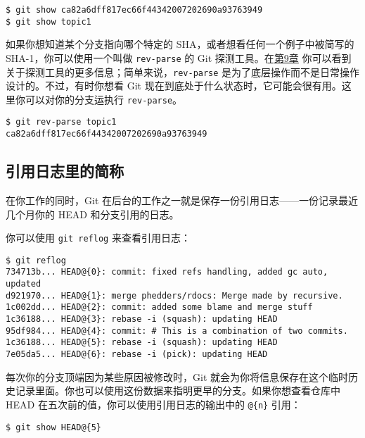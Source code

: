 \documentclass[a4paper]{book}
\newcommand{\prechap}{第}
\newcommand{\postchap}{章}
\newcommand{\chapref}[1]{\hyperref[chap:#1]{\prechap #1\postchap}}
\begin{document}
\begin{shaded}\begin{verbatim}
$ git show ca82a6dff817ec66f44342007202690a93763949
$ git show topic1
\end{verbatim}\end{shaded}

如果你想知道某个分支指向哪个特定的 SHA，或者想看任何一个例子中被简写的 SHA-1，你可以使用一个叫做 \texttt{rev-parse} 的 Git 探测工具。在\chapref{9} 你可以看到关于探测工具的更多信息；简单来说，\texttt{rev-parse} 是为了底层操作而不是日常操作设计的。不过，有时你想看 Git 现在到底处于什么状态时，它可能会很有用。这里你可以对你的分支运执行 \texttt{rev-parse}。

\begin{shaded}\begin{verbatim}
$ git rev-parse topic1
ca82a6dff817ec66f44342007202690a93763949
\end{verbatim}\end{shaded}

\subsection{引用日志里的简称}

在你工作的同时，Git 在后台的工作之一就是保存一份引用日志------一份记录最近几个月你的 HEAD 和分支引用的日志。

你可以使用 \texttt{git reflog} 来查看引用日志：

\begin{shaded}\begin{verbatim}
$ git reflog
734713b... HEAD@{0}: commit: fixed refs handling, added gc auto, updated
d921970... HEAD@{1}: merge phedders/rdocs: Merge made by recursive.
1c002dd... HEAD@{2}: commit: added some blame and merge stuff
1c36188... HEAD@{3}: rebase -i (squash): updating HEAD
95df984... HEAD@{4}: commit: # This is a combination of two commits.
1c36188... HEAD@{5}: rebase -i (squash): updating HEAD
7e05da5... HEAD@{6}: rebase -i (pick): updating HEAD
\end{verbatim}\end{shaded}

每次你的分支顶端因为某些原因被修改时，Git 就会为你将信息保存在这个临时历史记录里面。你也可以使用这份数据来指明更早的分支。如果你想查看仓库中 HEAD 在五次前的值，你可以使用引用日志的输出中的 \texttt{@\{n\}} 引用：

\begin{shaded}\begin{verbatim}
$ git show HEAD@{5}
\end{verbatim}\end{shaded}
\end{document}
